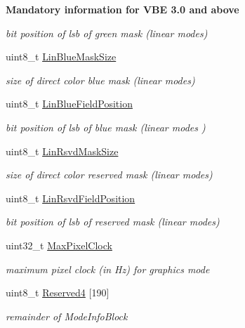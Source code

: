 \begin{Indent}{\bf Mandatory information for V\+BE 3.0 and above}
\begin{DoxyCompactItemize}
\begin{DoxyCompactList}\small\item\em bit position of lsb of green mask (linear modes) \end{DoxyCompactList}\item 
uint8\+\_\+t \hyperlink{structvbe__mode__info__t_ad8a25cec803bf91fb40a20a0aa5d5bf7}{Lin\+Blue\+Mask\+Size}
\begin{DoxyCompactList}\small\item\em size of direct color blue mask (linear modes) \end{DoxyCompactList}\item 
uint8\+\_\+t \hyperlink{structvbe__mode__info__t_a3f38d6becbe961786cd7ab58ec37fc07}{Lin\+Blue\+Field\+Position}
\begin{DoxyCompactList}\small\item\em bit position of lsb of blue mask (linear modes ) \end{DoxyCompactList}\item 
uint8\+\_\+t \hyperlink{structvbe__mode__info__t_a334886fc9a915ff91966c3aac1da586a}{Lin\+Rsvd\+Mask\+Size}
\begin{DoxyCompactList}\small\item\em size of direct color reserved mask (linear modes) \end{DoxyCompactList}\item 
uint8\+\_\+t \hyperlink{structvbe__mode__info__t_a3df070e698b5f54814e20c8813f7bf7e}{Lin\+Rsvd\+Field\+Position}
\begin{DoxyCompactList}\small\item\em bit position of lsb of reserved mask (linear modes) \end{DoxyCompactList}\item 
uint32\+\_\+t \hyperlink{structvbe__mode__info__t_ab1fbd72846963ebb34a308a7edf7bbe1}{Max\+Pixel\+Clock}
\begin{DoxyCompactList}\small\item\em maximum pixel clock (in Hz) for graphics mode \end{DoxyCompactList}\item 
uint8\+\_\+t \hyperlink{structvbe__mode__info__t_a2e13c4795a00241b919aa3aab86560ce}{Reserved4} \mbox{[}190\mbox{]}
\begin{DoxyCompactList}\small\item\em remainder of Mode\+Info\+Block \end{DoxyCompactList}\end{DoxyCompactItemize}
\end{Indent}


